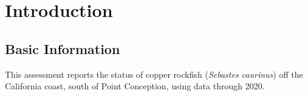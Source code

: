 \documentclass[11pt,
  english,
  a4paper,
]{article}
\begin{document}
\pagestyle{plain}  %
\renewcommand*{\thefootnote}{\arabic{footnote}}  %
\setcounter{footnote}{0}  %
\renewcommand{\headrulewidth}{0.5pt}
\renewcommand{\footrulewidth}{0.5pt}

\newcommand{\lt}{\ensuremath <}
\newcommand{\gt}{\ensuremath >}

\newlength{\cslhangindent}
\setlength{\cslhangindent}{1.5em}
\newenvironment{cslreferences}%
  {\setlength{\parindent}{0pt}%
  \everypar{\setlength{\hangindent}{\cslhangindent}}\ignorespaces}%
  {\par}

\pagebreak
{}
\setcounter{page}{1}

\pagebreak
\setlength{\parskip}{5mm plus1mm minus1mm}
\setcounter{page}{1}
\renewcommand{\thefigure}{\arabic{figure}}
\renewcommand{\thetable}{\arabic{table}}

\setcounter{table}{0}
\setcounter{figure}{0}

\setlength\parskip{0.5em plus 0.1em minus 0.2em}


\hypertarget{introduction}{%
\section{Introduction}\label{introduction}}

\leavevmode\tagmcend\tagstructend


\hypertarget{basic-information}{%
\subsection{Basic Information}\label{basic-information}}

\leavevmode\tagmcend\tagstructend


This assessment reports the status of copper rockfish (\emph{Sebastes caurinus}) off the California coast, south of Point Conception, using data through 2020.
\end{document}
